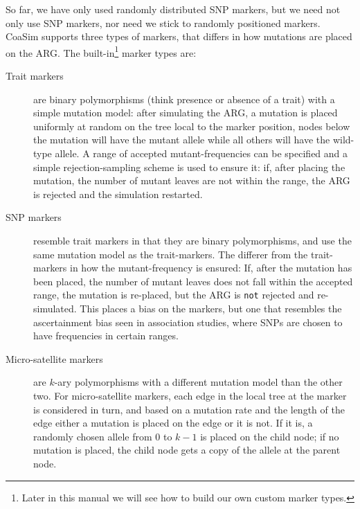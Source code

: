 \documentclass{manual}
\begin{document}
So far, we have only used randomly distributed SNP markers, but we
need not only use SNP markers, nor need we stick to randomly
positioned markers.  CoaSim supports three types of markers, that
differs in how mutations are placed on the ARG.  The
built-in\footnote{Later in this manual we will see how to build our
  own custom marker types.} marker types are:
\begin{description}
\item[Trait markers] are binary polymorphisms (think presence or
  absence of a trait) with a simple mutation model: after simulating
  the ARG, a mutation is placed uniformly at random on the tree local
  to the marker position, nodes below the mutation will have the
  mutant allele while all others will have the wild-type allele.  A
  range of accepted mutant-frequencies can be specified and a simple
  rejection-sampling scheme is used to ensure it: if, after placing
  the mutation, the number of mutant leaves are not within the range,
  the ARG is rejected and the simulation restarted.
  
\item[SNP markers] resemble trait markers in that they are binary
  polymorphisms, and use the same mutation model as the trait-markers.
  The differer from the trait-markers in how the mutant-frequency is
  ensured: If, after the mutation has been placed, the number of
  mutant leaves does not fall within the accepted range, the mutation
  is re-placed, but the ARG is \texttt{not} rejected and
  re-simulated.  This places a bias on the markers, but one that
  resembles the ascertainment bias seen in association studies, where
  SNPs are chosen to have frequencies in certain ranges.
  
\item[Micro-satellite markers] are $k$-ary polymorphisms with a
  different mutation model than the other two.  For micro-satellite
  markers, each edge in the local tree at the marker is considered in
  turn, and based on a mutation rate and the length of the edge either
  a mutation is placed on the edge or it is not.  If it is, a randomly
  chosen allele from $0$ to $k-1$ is placed on the child node; if no
  mutation is placed, the child node gets a copy of the allele at the
  parent node.
\end{description}
\end{document}

